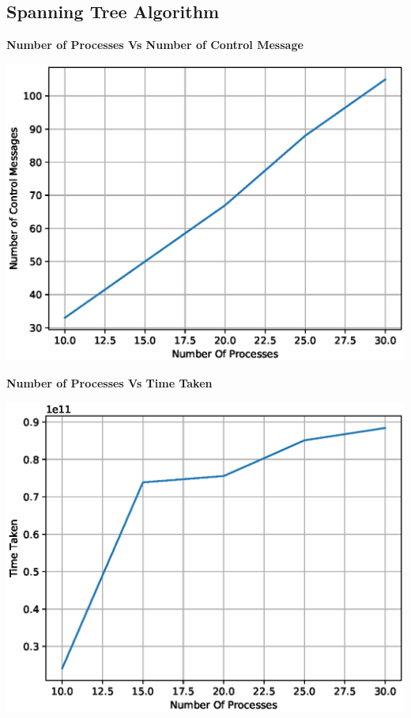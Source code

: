 \documentclass[a4paper,12pt]{report}
\begin{document}
\subsection{Spanning Tree Algorithm}
\begin{center}
\begin{large}
\textbf{Number of Processes Vs Number of Control Message}\\
\end{large}
\includegraphics[scale=0.7]{./ncm2.eps}
\end{center}
\begin{center}
\begin{large}
\textbf{Number of Processes Vs Time Taken}\\
\end{large}
\includegraphics[scale=0.7]{./tt2.eps}
\end{center}
\end{document}
